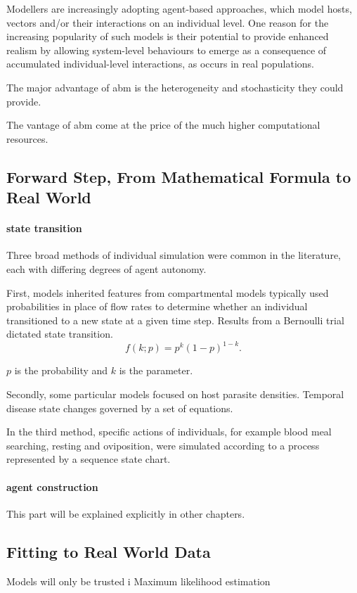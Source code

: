 \documentclass[a4paper, 12pt, twoside]{article}
\begin{document}
Modellers are increasingly adopting agent-based approaches, which model hosts, vectors and/or their interactions on an individual level.
One reason for the increasing popularity of such models is their potential to provide enhanced realism by allowing system-level behaviours to emerge as a consequence of accumulated individual-level interactions, as occurs in real populations.

The major advantage of \gls{abm} is the heterogeneity and stochasticity they could provide.

The vantage of \gls{abm} come at the price of the much higher computational resources.

\subsection{Forward Step, From Mathematical Formula to Real World}

\paragraph{state transition}%
\label{par:state_transition}
Three broad methods of individual simulation were common in the literature, each with differing degrees of agent autonomy.

First, models inherited features from compartmental models typically used probabilities in place of flow rates to determine whether an individual transitioned to a new state at a given time step.
Results from a Bernoulli trial dictated state transition.
\[
	f(k;p) = p^k ( 1 - p )^{1 - k}
	.\]

$p$ is the probability and  $k$ is the parameter.

Secondly, some particular models focused on host parasite densities.
Temporal disease state changes governed by a set of equations.

In the third method, specific actions of individuals, for example blood meal searching, resting and oviposition, were simulated according to a process represented by a sequence state chart.

\paragraph{agent construction}%
\label{par:agent_construction}
This part will be explained explicitly in other chapters.


\subsection{Fitting to Real World Data}
Models will only be trusted i
Maximum likelihood estimation
\end{document}

